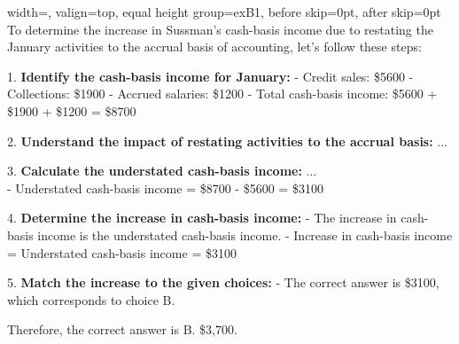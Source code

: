 \begin{minipage}[t]{0.49\linewidth}
\begin{bluebox}{width=\linewidth, valign=top, equal height group=exB1, before skip=0pt, after skip=0pt}
To determine the increase in Sussman's cash-basis income due to restating the January activities to the accrual basis of accounting, let's follow these steps:

1. \textbf{Identify the cash-basis income for January:}
   - Credit sales: \$5600
   - Collections: \$1900
   - Accrued salaries: \$1200
   - Total cash-basis income: \$5600 + \$1900 + \$1200 = \$8700

2. \textbf{Understand the impact of restating activities to the accrual basis:}
   ...

3. \textbf{Calculate the understated cash-basis income:}
   ... \\
   - Understated cash-basis income = \$8700 - \$5600 = \$3100

4. \textbf{Determine the increase in cash-basis income:}
   - The increase in cash-basis income is the understated cash-basis income.
   - Increase in cash-basis income = Understated cash-basis income = \$3100

5. \textbf{Match the increase to the given choices:}
   - The correct answer is \$3100, which corresponds to choice B.

Therefore, the correct answer is B. \$3,700.
\end{bluebox}
\end{minipage}


